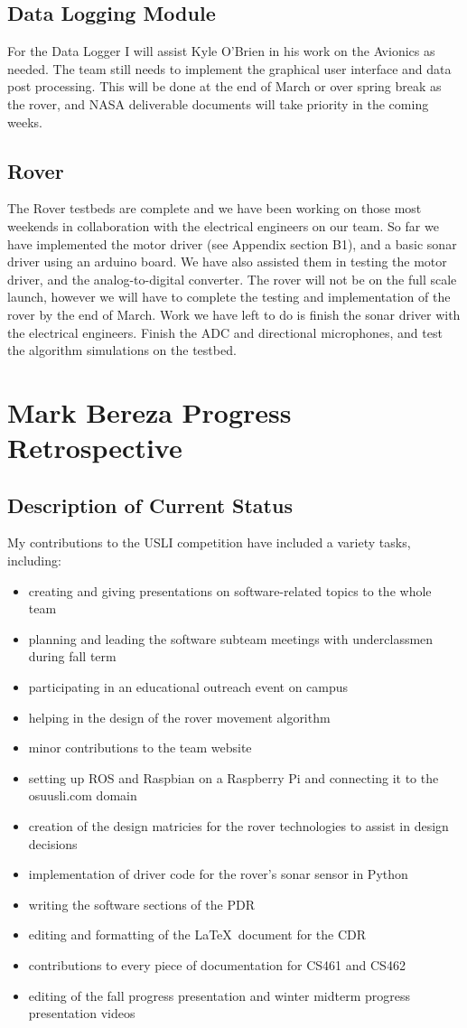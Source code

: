 \documentclass[onecolumn, draftclsnofoot,10pt, compsoc]{IEEEtran}
\begin{document}
\subsection{Data Logging Module}
For the Data Logger I will assist Kyle O'Brien in his work on the Avionics as needed. The team still needs to implement the graphical user interface and data post processing. This will be done at the end of March or over spring break as the rover, and NASA deliverable documents will take priority in the coming weeks.
\subsection{Rover}
The Rover testbeds are complete and we have been working on those most weekends in collaboration with the electrical engineers on our team. So far we have implemented the motor driver (see Appendix section B1), and a basic sonar driver using an arduino board. We have also assisted them in testing the motor driver, and the analog-to-digital converter. The rover will not be on the full scale launch, however we will have to complete the testing and implementation of the rover by the end of March. Work we have left to do is finish the sonar driver with the electrical engineers. Finish the ADC and directional microphones, and test the algorithm simulations on the testbed.

\section{Mark Bereza Progress Retrospective}
\subsection{Description of Current Status}
My contributions to the USLI competition have included a variety tasks, including:
\begin{itemize}
\item creating and giving presentations on software-related topics to the whole team
\item planning and leading the software subteam meetings with underclassmen during fall term
\item participating in an educational outreach event on campus
\item helping in the design of the rover movement algorithm
\item minor contributions to the team website
\item setting up ROS and Raspbian on a Raspberry Pi and connecting it to the osuusli.com domain
\item creation of the design matricies for the rover technologies to assist in design decisions
\item implementation of driver code for the rover's sonar sensor in Python
\item writing the software sections of the PDR
\item editing and formatting of the \LaTeX~document for the CDR
\item contributions to every piece of documentation for CS461 and CS462
\item editing of the fall progress presentation and winter midterm progress presentation videos
\end{itemize}
\end{document}
